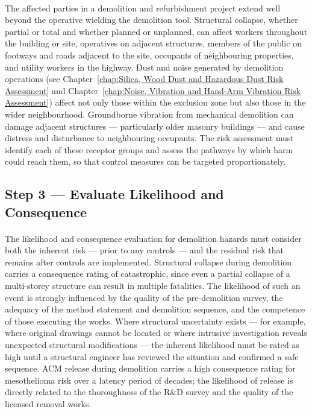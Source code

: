 \paragraph{}
The affected parties in a demolition and refurbishment project extend well beyond the operative wielding the demolition tool. Structural collapse, whether partial or total and whether planned or unplanned, can affect workers throughout the building or site, operatives on adjacent structures, members of the public on footways and roads adjacent to the site, occupants of neighbouring properties, and utility workers in the highway. Dust and noise generated by demolition operations (see Chapter~\ref{chap:Silica, Wood Dust and Hazardous Dust Risk Assessment} and Chapter~\ref{chap:Noise, Vibration and Hand-Arm Vibration Risk Assessment}) affect not only those within the exclusion zone but also those in the wider neighbourhood. Groundborne vibration from mechanical demolition can damage adjacent structures — particularly older masonry buildings — and cause distress and disturbance to neighbouring occupants. The risk assessment must identify each of these receptor groups and assess the pathways by which harm could reach them, so that control measures can be targeted proportionately.

\subsection{Step 3 --- Evaluate Likelihood and Consequence}

\paragraph{}
The likelihood and consequence evaluation for demolition hazards must consider both the inherent risk — prior to any controls — and the residual risk that remains after controls are implemented. Structural collapse during demolition carries a consequence rating of catastrophic, since even a partial collapse of a multi-storey structure can result in multiple fatalities. The likelihood of such an event is strongly influenced by the quality of the pre-demolition survey, the adequacy of the method statement and demolition sequence, and the competence of those executing the works. Where structural uncertainty exists — for example, where original drawings cannot be located or where intrusive investigation reveals unexpected structural modifications — the inherent likelihood must be rated as high until a structural engineer has reviewed the situation and confirmed a safe sequence. ACM release during demolition carries a high consequence rating for mesothelioma risk over a latency period of decades; the likelihood of release is directly related to the thoroughness of the R\&D survey and the quality of the licensed removal works.

